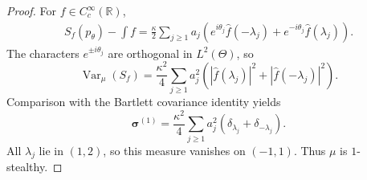 \documentclass[11pt,reqno,a4paper]{amsart}
\numberwithin{equation}{section}
\theoremstyle{compact}
\theoremstyle{definition}
\theoremstyle{definition}
\newcommand{\Var}{\operatorname{Var}}
\begin{document}
\begin{proof}
For $f\in C_c^\infty(\mathbb R)$,
\begin{align*}
  S_f(p_\theta)-\int f
  =\frac{\kappa}{2}\sum_{j\geq1}a_j
   \left(
     e^{i\theta_j}\widehat f(-\lambda_j)
     +e^{-i\theta_j}\widehat f(\lambda_j)
   \right).
\end{align*}
The characters $e^{\pm i\theta_j}$ are orthogonal in $L^2(\Theta)$, so
\[
  \Var_\mu(S_f)
  =\frac{\kappa^2}{4}\sum_{j\geq1}a_j^2
    \left(|\widehat f(\lambda_j)|^2+|\widehat f(-\lambda_j)|^2\right).
\]
Comparison with the Bartlett covariance identity yields
\begin{equation}\label{eq:beat-first-bartlett}
  \boldsymbol\sigma^{(1)}
  =\frac{\kappa^2}{4}
   \sum_{j\geq1}a_j^2
      (\delta_{\lambda_j}+\delta_{-\lambda_j}).
\end{equation}
All $\lambda_j$ lie in $(1,2)$, so this measure vanishes on $(-1,1)$.
Thus $\mu$ is $1$-stealthy.


\end{proof}
\end{document}
